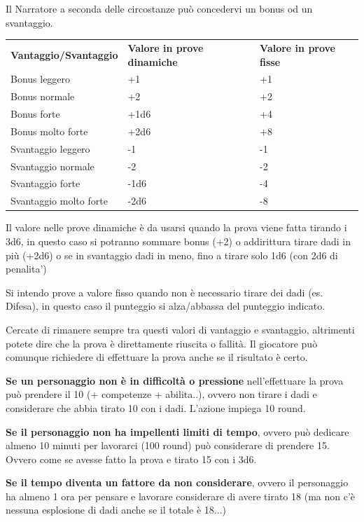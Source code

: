 \documentclass[a4paper,11pt,twoside,openany]{book}
\begin{document}
Il Narratore a seconda delle circostanze può concedervi un bonus od un svantaggio.

\bigskip

\begin{tabular}{lll}
	\toprule
	\textbf{Vantaggio/Svantaggio} & \textbf{Valore in prove dinamiche} & \textbf{Valore in prove fisse}\tabularnewline
	Bonus leggero                 & +1                                 & +1\tabularnewline
	Bonus normale                 & +2                                 & +2\tabularnewline
	Bonus forte                   & +1d6                               & +4\tabularnewline
	Bonus molto forte             & +2d6                               & +8\tabularnewline
	Svantaggio leggero            & -1                                 & -1\tabularnewline
	Svantaggio normale            & -2                                 & -2\tabularnewline
	Svantaggio forte              & -1d6                               & -4\tabularnewline
	Svantaggio molto forte        & -2d6                               & -8\tabularnewline
\end{tabular}

\bigskip

Il valore nelle prove dinamiche è da usarsi quando la prova viene fatta tirando i 3d6, in questo caso si potranno sommare bonus (+2) o addirittura tirare dadi in più (+2d6) o se in svantaggio dadi in meno, fino a tirare solo 1d6 (con 2d6 di penalita')

Si intendo prove a valore fisso quando non è necessario tirare dei dadi (es. Difesa), in questo caso il punteggio si alza/abbassa del punteggio indicato.

Cercate di rimanere sempre tra questi valori di vantaggio e svantaggio, altrimenti potete dire che la prova è direttamente riuscita o fallità.
Il giocatore può comunque richiedere di effettuare la prova anche se il risultato è certo.

\textbf{Se un personaggio non è in difficoltà o pressione} nell'effettuare la prova può prendere il 10 (+ competenze + abilita..), ovvero non tirare i dadi e considerare che abbia tirato 10 con i dadi. L'azione impiega 10 round.

\textbf{Se il personaggio non ha impellenti limiti di tempo}, ovvero può dedicare almeno 10 minuti per lavorarci (100 round) può considerare di prendere 15. Ovvero come se avesse fatto la prova e tirato 15 con i 3d6.

\textbf{Se il tempo diventa un fattore da non considerare}, ovvero il personaggio ha almeno 1 ora per pensare e lavorare considerare di avere tirato 18 (ma non c'è nessuna esplosione di dadi anche se il totale è 18...)
\end{document}
